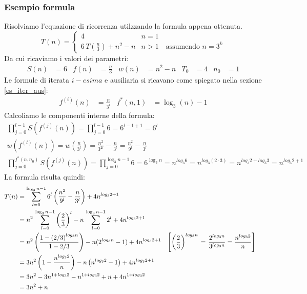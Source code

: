 \subsubsection{Esempio formula}
Risolviamo l'equazione di ricorrenza utilzzando la formula appena ottenuta.
\[
    T(n) = 
    \begin{cases} 
        4      &  n = 1 \\
        6 \, T\left(\frac{n}{3}\right) + n^2-n & n > 1 \quad \text{assumendo } n=3^k
    \end{cases}
\]
Da cui ricaviamo i valori dei parametri:
\begin{align*}
    S(n)&=6 & f(n)&=\frac{n}{3} & w(n)&=n^2-n & T_0&=4 & n_0&=1
\end{align*}
Le formule di iterata $i-esima$ e ausiliaria si ricavano come spiegato nella sezione \ref{es_iter_aus}:
\begin{align*}
    f^{(i)}(n) &= \frac{n}{3^i} & f^*(n, 1) &= \log_3 \left( n \right) - 1
\end{align*}
Calcoliamo le componenti interne della formula:
\begin{gather*}
    \prod_{j=0}^{l-1} S \left( f^{(j)}(n) \right) = \prod_{j=0}^{l-1} 6 = 6^{l-1+1} = 6^l \\
    w\left(f^{(l)}(n) \right) =  w \left( \frac{n}{3^l} \right) = \frac{n^2}{3^{2l}} - \frac{n}{3^l} = \frac{n^2}{9^l}-\frac{n}{3^l} \\
    \prod_{j=0}^{f^*(n,n_0)} S \left( f^{(j)}(n) \right) = \prod_{j=0}^{\log_3 n-1} 6 = 6^{\log_3 n} =
    n^{log_3 6} = n^{log_3 (2\cdot3)} = n^{log_3 2 + log_3 3} = n^{log_3 2 + 1}
\end{gather*}
La formula risulta quindi:
\begin{align*}
    T(n) & = \sum_{l=0}^{\log_3 n-1} 6^l \left( \frac{n^2}{9^l}-\frac{n}{3^l} \right) + 4 n^{log_3 2 + 1} \\
    & = n^2\,\sum_{l=0}^{\log_3 n-1} \left( \frac{2}{3} \right)^l - n\,\sum_{l=0}^{\log_3 n-1} 2^l+ 4 n^{log_3 2+1} \\
    & = n^2 \left( \frac{1- \left( 2/3 \right)^{log_3 n} }{1 - 2/3 } \right) - n(2^{log_3 n} -1) + 4 n^{log_3 2+1} 
    &
    \left[
    \left( \frac{2}{3} \right)^{log_3 n}
    \right. %
    &=      %
    \left.  %
    \frac{2^{log_3 n}}{3^{log_3 n}} = \frac{n^{log_3 2}}{n}
    \vphantom{\left( \frac{2}{3} \right)^{log_3 n}}
    \right] %
    \\
    & = 3n^2 \left( 1- \frac{n^{log_3 2}}{n} \right) - n \left( n^{log_3 2}-1 \right) + 4 n^{log_3 2+1} \\
    & = 3n^2 -3n^{1+log_3 2} - n^{1+log_3 2} + n + 4 n^{1+log_3 2} \\
    & = 3n^2+n
\end{align*}
